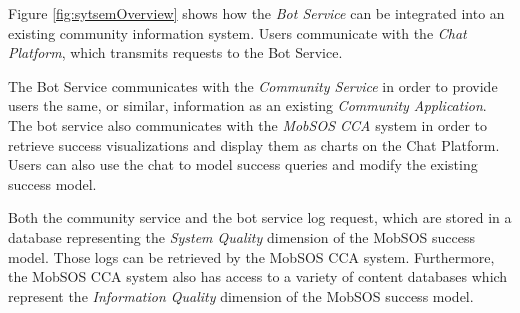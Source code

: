 Figure \ref{fig:sytsemOverview} shows how the \emph{Bot Service} can be integrated into an existing community information system. Users communicate with the \emph{Chat Platform}, which transmits requests to the Bot Service.

The Bot Service communicates with the \emph{Community Service} in order to provide users the same, or similar, information as an existing \emph{Community Application}. The bot service also communicates with the \emph{MobSOS CCA} system in order to retrieve success visualizations and display them as charts on the Chat Platform. Users can also use the chat to model success queries and modify the existing success model.

Both the community service and the bot service log request, which are stored in a database representing the \emph{System Quality} dimension of the MobSOS success model. Those logs can be retrieved by the MobSOS CCA system. Furthermore, the MobSOS CCA system also has access to a variety of content databases which represent the \emph{Information Quality} dimension of the MobSOS success model.